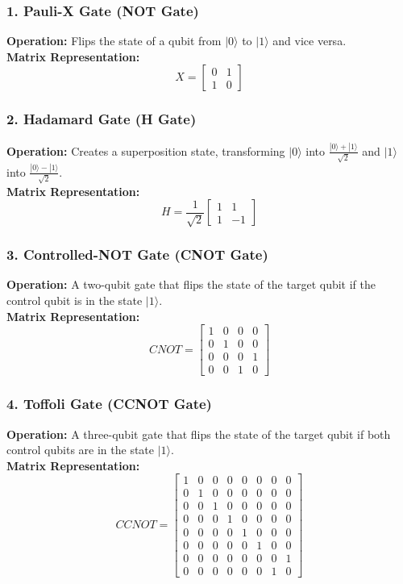 \documentclass[11pt]{article}
\theoremstyle{definition}
\begin{document}
\subsubsection*{1. Pauli-X Gate (NOT Gate)}
\textbf{Operation:} Flips the state of a qubit from $|0\rangle$ to $|1\rangle$ and vice versa. \\
\textbf{Matrix Representation:}
\[
X = 
\begin{bmatrix}
0 & 1 \\
1 & 0
\end{bmatrix}
\]

\subsubsection*{2. Hadamard Gate (H Gate)}
\textbf{Operation:} Creates a superposition state, transforming $|0\rangle$ into $\frac{|0\rangle + |1\rangle}{\sqrt{2}}$ and $|1\rangle$ into $\frac{|0\rangle - |1\rangle}{\sqrt{2}}$. \\
\textbf{Matrix Representation:}
\[
H = \frac{1}{\sqrt{2}}
\begin{bmatrix}
1 & 1 \\
1 & -1
\end{bmatrix}
\]

\subsubsection*{3. Controlled-NOT Gate (CNOT Gate)}
\textbf{Operation:} A two-qubit gate that flips the state of the target qubit if the control qubit is in the state $|1\rangle$. \\
\textbf{Matrix Representation:}
\[
CNOT =
\begin{bmatrix}
1 & 0 & 0 & 0 \\
0 & 1 & 0 & 0 \\
0 & 0 & 0 & 1 \\
0 & 0 & 1 & 0
\end{bmatrix}
\]

\subsubsection*{4. Toffoli Gate (CCNOT Gate)}
\textbf{Operation:} A three-qubit gate that flips the state of the target qubit if both control qubits are in the state $|1\rangle$. \\
\textbf{Matrix Representation:}
\[
CCNOT =
\begin{bmatrix}
1 & 0 & 0 & 0 & 0 & 0 & 0 & 0 \\
0 & 1 & 0 & 0 & 0 & 0 & 0 & 0 \\
0 & 0 & 1 & 0 & 0 & 0 & 0 & 0 \\
0 & 0 & 0 & 1 & 0 & 0 & 0 & 0 \\
0 & 0 & 0 & 0 & 1 & 0 & 0 & 0 \\
0 & 0 & 0 & 0 & 0 & 1 & 0 & 0 \\
0 & 0 & 0 & 0 & 0 & 0 & 0 & 1 \\
0 & 0 & 0 & 0 & 0 & 0 & 1 & 0
\end{bmatrix}
\]
\end{document}
